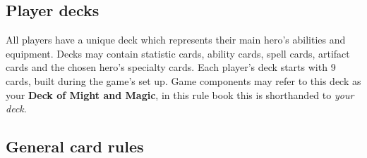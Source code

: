 \subsection*{\hypertarget{Playerdecks}{Player decks}}
All players have a unique deck which represents their main hero's abilities and equipment.
Decks may contain statistic cards, ability cards, spell cards, artifact cards and the chosen hero’s specialty cards.
Each player’s deck starts with 9 cards, built during the game’s set up.
Game components may refer to this deck as your \textbf{Deck of Might and Magic}, in this rule book this is shorthanded to \textit{your deck}.
\subsection*{General card rules}
